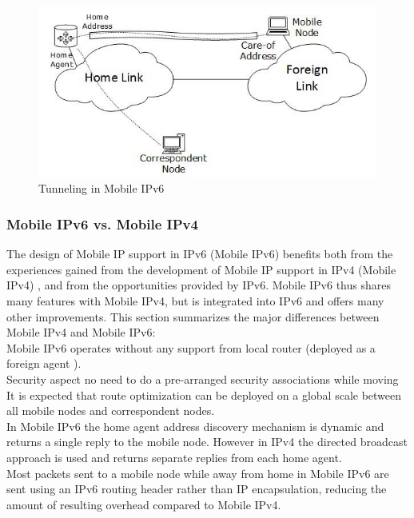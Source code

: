 \documentclass{article}
\begin{document}
\begin{figure}[h!]
  \centering
    \includegraphics[scale=0.5]{reportPictures/figure2.png}
  \caption{Tunneling in Mobile IPv6}
\end{figure}

\newpage 

\subsubsection{Mobile IPv6 vs. Mobile IPv4}


The design of Mobile IP support in IPv6 (Mobile IPv6) benefits both
from the experiences gained from the development of Mobile IP support
in IPv4 (Mobile IPv4) , and from the opportunities provided by IPv6.
Mobile IPv6 thus shares many features with Mobile IPv4, but is
integrated into IPv6 and offers many other improvements. This section
summarizes the major differences between Mobile IPv4 and Mobile IPv6:\\
\newline
Mobile IPv6 operates without any support from local router (deployed
as a foreign agent ).\\
\newline
Security aspect no need to do a pre-arranged
security associations while moving It is expected that route
optimization can be deployed on a global scale between all mobile
nodes and correspondent nodes.\\
\newline
In Mobile IPv6 the home agent address discovery mechanism is dynamic
and returns a single reply to the mobile node. However in IPv4 the
directed broadcast approach is used and returns separate replies from
each home agent.\\
\newline
Most packets sent to a mobile node while away from home in Mobile IPv6
are sent using an IPv6 routing header rather than IP encapsulation,
reducing the amount of resulting overhead compared to Mobile IPv4.
\end{document}
